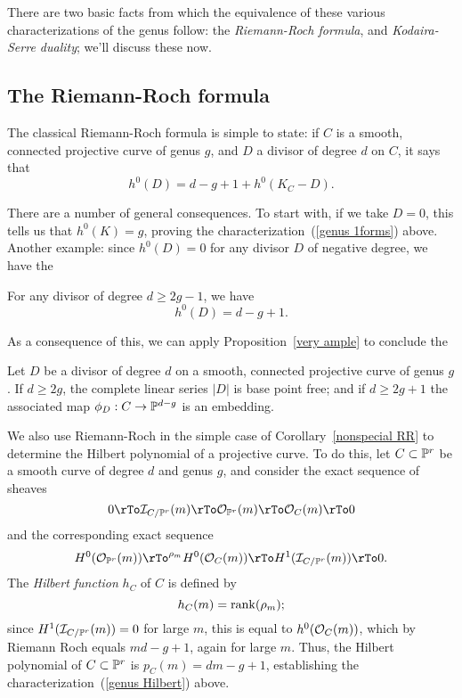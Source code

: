 There are two basic facts from which the equivalence of these various characterizations of the genus follow: the \emph{Riemann-Roch formula}, and \emph{Kodaira-Serre duality}; we'll discuss these now.

\subsection{The Riemann-Roch formula}

The classical Riemann-Roch formula is simple to state: if $C$ is a smooth, connected projective curve of genus $g$, and $D$ a divisor of degree $d$ on $C$, it says that
$$
h^0(D) = d - g + 1 + h^0(K_C - D).
$$

There are a number of general consequences. To start with, if we take $D=0$, this tells us that $h^0(K) = g$, proving the characterization~(\ref{genus 1forms}) above. Another example: since $h^0(D) = 0$ for any divisor $D$ of negative degree, we have the

\begin{corollary}\label{nonspecial RR}
For any divisor of degree $d \geq 2g-1$, we have
$$
h^0(D) = d - g + 1.
$$
\end{corollary}

As a consequence of this, we can apply Proposition~\ref{very ample} to conclude the

\begin{corollary}
Let $D$ be a divisor of degree $d$ on a smooth, connected projective curve of genus $g$. If $d \geq 2g$, the complete linear series $|D|$ is base point free; and if $d \geq 2g+1$ the associated map $\phi_D : C \to \PP^{d-g}$ is an embedding.
\end{corollary}

We also use Riemann-Roch in the simple case of Corollary~\ref{nonspecial RR} to determine the Hilbert polynomial of a projective curve. To do this, let $C \subset \PP^r$ be a smooth curve of degree $d$ and genus $g$, and consider the exact sequence of sheaves
$$
0 \rTo \cI_{C/\PP^r}(m) \rTo \cO_{\PP^r}(m) \rTo \cO_C(m) \rTo 0
$$
and the corresponding exact sequence
$$
 H^0(\cO_{\PP^r}(m)) \rTo^{\rho_m} H^0(\cO_C(m)) \rTo H^1(\cI_{C/\PP^r}(m)) \rTo 0.
$$
The \emph{Hilbert function} $h_C$ of $C$  is defined by
$$
h_C(m) = \rank(\rho_m);
$$
 since $H^1(\cI_{C/\PP^r}(m)) = 0$ for large $m$, this is equal to $h^0(\cO_C(m))$, which by Riemann Roch equals $md-g+1$, again for large $m$. Thus, the Hilbert polynomial of $C \subset \PP^r$ is $p_C(m) = dm-g+1$, establishing the characterization~(\ref{genus Hilbert}) above.

